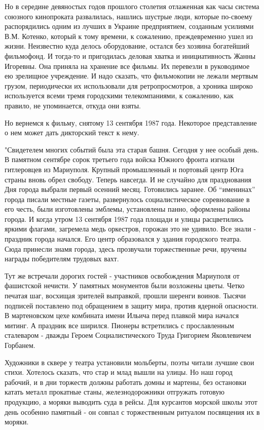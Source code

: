 
Но в середине девяностых годов прошлого столетия отлаженная как часы система
союзного кинопроката развалилась, нашлись шустрые люди, которые по-своему
распорядились одним из лучших в Украине предприятием, созданным усилиями В.М.
Котенко, который к тому времени, к сожалению, преждевременно ушел из жизни.
Неизвестно куда делось оборудование, остался без хозяина богатейший фильмофонд.
И тогда-то и пригодилась деловая хватка и инициативность Жанны Игоревны. Она
приняла на хранение все фильмы. Их перевезли в руководимое ею зрелищное
учреждение. И надо сказать, что фильмокопии не лежали мертвым грузом,
периодически их использовали для ретропросмотров, а хроника широко используется
всеми тремя городскими телекомпаниями, к сожалению, как правило, не
упоминается, откуда они взяты.

Но вернемся к фильму, снятому 13 сентября 1987 года. Некоторое представление о
нем может дать дикторский текст к нему.

"Свидетелем многих событий была эта старая башня. Сегодня у нее особый день. В
памятном сентябре сорок третьего года войска Южного фронта  изгнали
гитлеровцев из Мариуполя. Крупный промышленный и портовый центр Юга страны
вновь обрел свободу. Теперь навсегда. И не случайно для празднования Дня города
выбрали первый осенний месяц. Готовились заранее. Об \enquote{именинах} города писали
местные газеты, развернулось социалистическое соревнование в его честь, были
изготовлены эмблемы, установлены панно, оформлены районы города. И когда утром
13 сентября 1987 года площади и улицы расцветились яркими флагами, загремела
медь оркестров, горожан это не удивило. Все знали  - праздник города начался.
Его  центр образовался у здания городского театра. Сюда принесли знамя города,
здесь прозвучали торжественные речи, вру­чены награды победителям трудовых
вахт.

Тут же встречали дорогих гостей - участ­ников освобождения Мариуполя от
фашистской нечисти. У памятных монументов были возложены цветы. Четко печатая
шаг, восхищая зрителей выправкой, прошли шеренги воинов. Тысячи подписей
поставлено под обращением в защиту мира, против ядерной опасности. В
мартеновском цехе комбината имени Ильича перед плавкой мира начался митинг. А
праздник все ширился. Пионеры встретились с прославленным сталеваром - дважды
Героем Социалистического Труда Григорием Яковлевичем Горбанем.

Художники в сквере у театра установили мольберты, поэты читали лучшие свои
стихи. Хотелось сказать, что стар и млад вышли на улицы. Но наш город рабочий,
и в дни торжеств должны работать домны и мартены, без остановки катать металл
прокатные станы, железнодорожники отгружать готовую продукцию, а моряки
выводить суда в рейсы. Для курсантов морской школы этот день особенно памятный
- он совпал с торжественным ри­туалом посвящения их в моряки.

